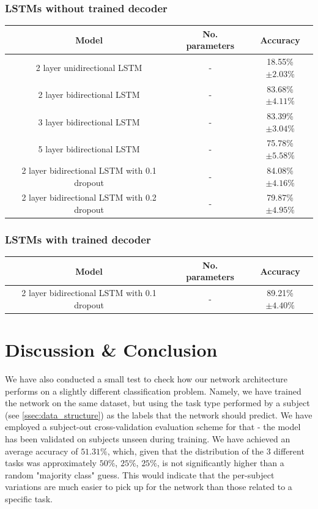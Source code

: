 \documentclass{article}
\begin{document}
\subsubsection{LSTMs without trained decoder}
\begin{center}
\begin{tabular}{ c|c|c } 
 Model & No. parameters & Accuracy \\ 
 \hline
 2 layer unidirectional LSTM & - & 18.55\% $\pm 2.03\% $\\ 
 2 layer bidirectional LSTM & - & 83.68\% $\pm 4.11\%$ \\ 
 3 layer bidirectional LSTM & - & 83.39\% $\pm 3.04\%$ \\ 
 5 layer bidirectional LSTM & - & 75.78\% $\pm 5.58\%$ \\
 2 layer bidirectional LSTM with 0.1 dropout & - & 84.08\% $\pm 4.16\%$ \\
 2 layer bidirectional LSTM with 0.2 dropout & - & 79.87\% $\pm 4.95\%$ \\
\end{tabular}
\end{center}
\subsubsection{LSTMs with trained decoder}
\begin{center}
\begin{tabular}{ c|c|c } 
 Model & No. parameters & Accuracy \\ 
 \hline
 2 layer bidirectional LSTM with 0.1 dropout & - & 89.21\% $\pm 4.40\%$ \\
\end{tabular}
\end{center}

\section{Discussion \& Conclusion}
We have also conducted a small test to check how our network architecture performs on a slightly different classification problem. Namely, we have trained the network on the same dataset, but using the task type performed by a subject (see \ref{ssec:data_structure}) as the labels that the network should predict. We have employed a subject-out cross-validation evaluation scheme for that - the model has been validated on subjects unseen during training. We have achieved an average accuracy of $51.31\%$, which, given that the distribution of the 3 different tasks was approximately $50\%$, $25\%$, $25\%$, is not significantly higher than a random "majority class" guess. This would indicate that the per-subject variations are much easier to pick up for the network than those related to a specific task.
\end{document}
